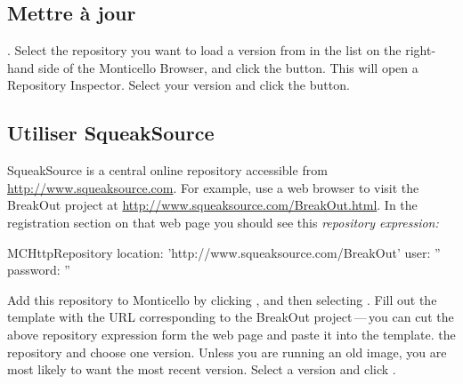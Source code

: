 \documentclass[a4paper,10pt,twoside]{book}
\begin{document}

\subsection{Mettre \`a jour}

. 
Select the repository you want to load a version from in the list on the right-hand side of the Monticello Browser, and click the  button. This will open a Repository Inspector. Select your version and click the  button.


\subsection{Utiliser SqueakSource}

SqueakSource is a central online repository accessible from \url{http://www.squeaksource.com}. For example, use a web browser to visit the BreakOut project at \url{http://www.squeaksource.com/BreakOut.html}. In the registration section on that web page you should see this \emph{repository expression:}

\begin{code}{}
MCHttpRepository
    location: 'http://www.squeaksource.com/BreakOut'
    user: ''
    password: ''
\end{code}

Add this repository to Monticello by clicking , and then selecting . Fill out the template with the URL corresponding to the BreakOut project\,---\,you can cut the above repository expression form the web page and paste it into the template.
 the repository and choose one version. 
Unless you are running an old image, you are most likely to want the most recent version. Select a version and click .
\end{document}
